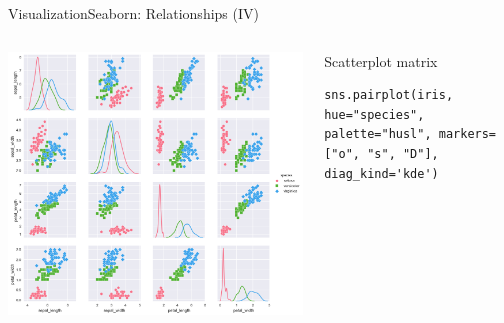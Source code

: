 \documentclass[10pt,compress]{beamer} %
\begin{document}
\begin{frame}[fragile]{Visualization}{Seaborn: Relationships (IV)}
	\begin{columns}
	\includegraphics[width=\textwidth]{figs/sns-pairkde.png}\\
	\begin{exampleblock}{\footnotesize{Scatterplot matrix}}
	\vspace{-0.2cm} 
	\begin{lstlisting}[basicstyle=\tiny]
	sns.pairplot(iris, hue="species", palette="husl", markers=["o", "s", "D"], diag_kind='kde')
	\end{lstlisting}
	\vspace{-0.2cm} 
	\end{exampleblock}


\end{columns}
\end{frame}
\end{document}
